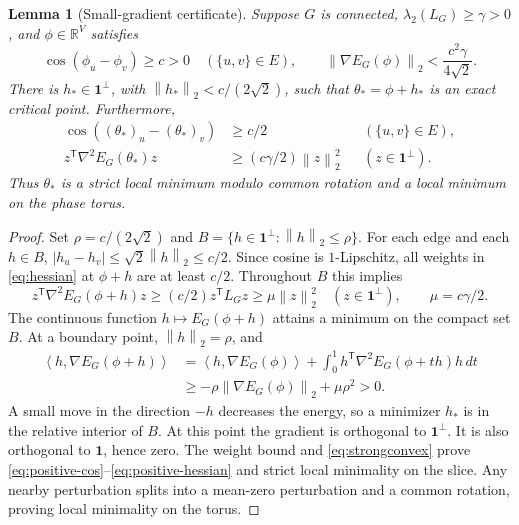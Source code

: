 \documentclass[11pt]{article}
\newtheorem{lemma}[theorem]{Lemma}
\theoremstyle{definition}
\theoremstyle{remark}
\newcommand{\R}{\mathbb R}
\newcommand{\one}{\mathbf 1}
\newcommand{\norm}[1]{\left\lVert#1\right\rVert}
\newcommand{\ip}[2]{\left\langle#1,#2\right\rangle}
\begin{document}
\begin{lemma}[Small-gradient certificate]\label{lem:certificate}
Suppose $G$ is connected, $\lambda_2(L_G)\ge\gamma>0$, and
$\phi\in\R^V$ satisfies
\begin{equation}\label{eq:certificate-hyp}
 \cos(\phi_u-\phi_v)\ge c>0\quad(\{u,v\}\in E),
 \qquad
 \norm{\nabla E_G(\phi)}_2<\frac{c^2\gamma}{4\sqrt2}.
\end{equation}
There is $h_*\in\one^\perp$, with $\norm{h_*}_2<c/(2\sqrt2)$, such that
$\theta_* =\phi+h_*$ is an exact critical point. Furthermore,
\begin{align}
 \cos((\theta_*)_u-(\theta_*)_v)&\ge c/2
       &&(\{u,v\}\in E),\label{eq:positive-cos}\\
 z^{\mathsf T}\nabla^2E_G(\theta_*)z
       &\ge(c\gamma/2)\norm z_2^2
       &&(z\in\one^\perp).\label{eq:positive-hessian}
\end{align}
Thus $\theta_*$ is a strict local minimum modulo common rotation and a local
minimum on the phase torus.
\end{lemma}

\begin{proof}
Set $\rho=c/(2\sqrt2)$ and
$B=\{h\in\one^\perp:\norm h_2\le\rho\}$.
For each edge and each $h\in B$,
$|h_u-h_v|\le\sqrt2\norm h_2\le c/2$.
Since cosine is $1$-Lipschitz, all weights in \eqref{eq:hessian} at
$\phi+h$ are at least $c/2$. Throughout $B$ this implies
\begin{equation}\label{eq:strongconvex}
 z^{\mathsf T}\nabla^2E_G(\phi+h)z
  \ge(c/2)z^{\mathsf T}L_Gz
  \ge\mu\norm z_2^2\quad(z\in\one^\perp),\qquad \mu=c\gamma/2.
\end{equation}
The continuous function $h\mapsto E_G(\phi+h)$ attains a minimum on the
compact set $B$. At a boundary point, $\norm h_2=\rho$, and
\begin{align*}
 \ip h{\nabla E_G(\phi+h)}
 &=\ip h{\nabla E_G(\phi)}
   +\int_0^1h^{\mathsf T}\nabla^2E_G(\phi+th)h\,dt\\
 &\ge-\rho\norm{\nabla E_G(\phi)}_2+\mu\rho^2>0.
\end{align*}
A small move in the direction $-h$ decreases the energy, so a minimizer
$h_*$ is in the relative interior of $B$. At this point the gradient is
orthogonal to $\one^\perp$. It is also orthogonal to $\one$, hence zero.
The weight bound and \eqref{eq:strongconvex} prove
\eqref{eq:positive-cos}--\eqref{eq:positive-hessian} and strict local
minimality on the slice. Any nearby perturbation splits into a mean-zero
perturbation and a common rotation, proving local minimality on the torus.
\end{proof}
\end{document}
